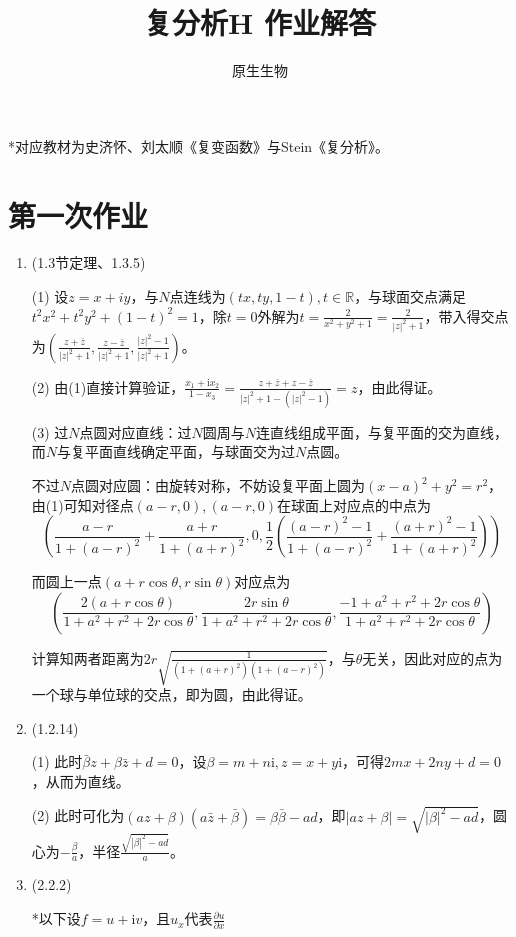 \documentclass[a4paper,UTF8,fontset=windows]{ctexart}
\title{复分析H 作业解答}
\author{原生生物}
\date{}
\begin{document}
\maketitle
*对应教材为史济怀、刘太顺《复变函数》与Stein《复分析》。

\tableofcontents
\newpage
\section{第一次作业}
\begin{enumerate}
    \item (1.3节定理、1.3.5)

    (1) 设$z=x+iy$，与$N$点连线为$(tx,ty,1-t),t\in\mathbb{R}$，与球面交点满足$t^2x^2+t^2y^2+(1-t)^2=1$，除$t=0$外解为$t=\frac{2}{x^2+y^2+1}=\frac{2}{|z|^2+1}$，带入得交点为$(\frac{z+\bar{z}}{|z|^2+1},\frac{z-\bar{z}}{|z|^2+1},\frac{|z|^2-1}{|z|^2+1})$。

    (2) 由(1)直接计算验证，$\frac{x_1+\mathrm{i}x_2}{1-x_3}=\frac{z+\bar{z}+z-\bar{z}}{|z|^2+1-(|z|^2-1)}=z$，由此得证。

    (3) 过$N$点圆对应直线：过$N$圆周与$N$连直线组成平面，与复平面的交为直线，而$N$与复平面直线确定平面，与球面交为过$N$点圆。

    不过$N$点圆对应圆：由旋转对称，不妨设复平面上圆为$(x-a)^2+y^2=r^2$，由(1)可知对径点$(a-r,0),(a-r,0)$在球面上对应点的中点为
    \[\left(\frac{a-r}{1+(a-r)^2}+\frac{a+r}{1+(a+r)^2},0,\frac{1}{2}\left(\frac{(a-r)^2-1}{1+(a-r)^2}+\frac{(a+r)^2-1}{1+(a+r)^2}\right)\right)\]

    而圆上一点$(a+r\cos\theta,r\sin\theta)$对应点为
    \[\left(\frac{2(a+r\cos\theta)}{1+a^2+r^2+2r\cos\theta},\frac{2r\sin\theta}{1+a^2+r^2+2r\cos\theta},\frac{-1+a^2+r^2+2r\cos\theta}{1+a^2+r^2+2r\cos\theta}\right)\]

    计算知两者距离为$2r\sqrt{\frac{1}{(1+(a+r)^2)(1+(a-r)^2)}}$，与$\theta$无关，因此对应的点为一个球与单位球的交点，即为圆，由此得证。

    \item (1.2.14)

    (1) 此时$\bar{\beta}z+\beta\bar{z}+d=0$，设$\beta=m+n\mathrm{i},z=x+y\mathrm{i}$，可得$2mx+2ny+d=0$，从而为直线。

    (2) 此时可化为$(az+\beta)(a\bar{z}+\bar{\beta})=\beta\bar{\beta}-ad$，即$|az+\beta|=\sqrt{|\beta|^2-ad}$，圆心为$-\frac{\beta}{a}$，半径$\frac{\sqrt{|\beta|^2-ad}}{a}$。

    \item (2.2.2)

    *以下设$f=u+\mathrm{i}v$，且$u_x$代表$\frac{\partial u}{\partial x}$


\end{enumerate}
\end{document}
